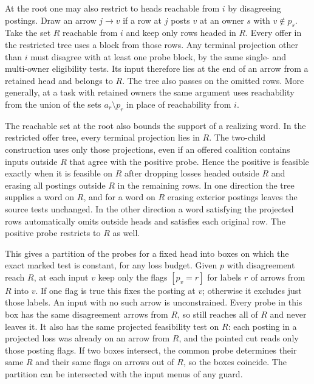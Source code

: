 At the root one may also restrict to heads reachable
from $i$ by disagreeing postings. Draw an arrow
$j\to v$ if a row at $j$ posts $v$ at an owner $s$
with $v\notin p_s$. Take the set $R$ reachable from
$i$ and keep only rows headed in $R$. Every offer in
the restricted tree uses a block from those rows.
Any terminal projection other than $i$ must disagree
with at least one probe block, by the same single-
and multi-owner eligibility tests. Its input therefore
lies at the end of an arrow from a retained head and
belongs to $R$. The tree also passes on the omitted
rows. More generally, at a task with retained owners
the same argument uses reachability from the union
of the sets $a_r\setminus p_r$ in place of reachability
from $i$.

The reachable set at the root also bounds the support
of a realizing word. In the restricted offer tree,
every terminal projection lies in $R$. The two-child
construction uses only those projections, even if an
offered coalition contains inputs outside $R$ that
agree with the positive probe. Hence the positive is
feasible exactly when it is feasible on $R$ after
dropping losses headed outside $R$ and erasing all
postings outside $R$ in the remaining rows. In one
direction the tree supplies a word on $R$, and for a
word on $R$ erasing exterior postings leaves the
source tests unchanged. In the other direction a
word satisfying the projected rows automatically
omits outside heads and satisfies each original
row. The positive probe restricts to $R$ as well.

This gives a partition of the probes for a fixed
head into boxes on which the exact marked test is
constant, for any loss budget. Given $p$ with
disagreement reach $R$, at each input $v$ keep
only the flags $[p_v=r]$ for labels $r$ of arrows
from $R$ into $v$. If one flag is true this fixes
the posting at $v$; otherwise it excludes just
those labels. An input with no such arrow is
unconstrained. Every probe in this box has the
same disagreement arrows from $R$, so still
reaches all of $R$ and never leaves it. It also
has the same projected feasibility test on $R$:
each posting in a projected loss was already on
an arrow from $R$, and the pointed cut reads
only those posting flags. If two boxes intersect,
the common probe determines their same $R$ and
their same flags on arrows out of $R$, so the
boxes coincide. The partition can be intersected
with the input menus of any guard.

